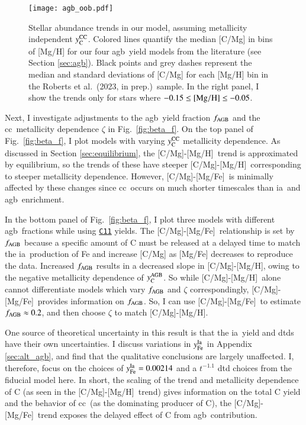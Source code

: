 \documentclass[12pt,oneside,letterpaper]{report}
\newcommand{\cc}{\gls{cc}}
\newcommand{\agb}{\gls{agb}}
\newcommand{\ia}{\gls{ia}}
\newcommand{\citetjack}{Roberts et al.~(2023, in prep.)}
\newcommand{\cxi}{\texttt{\hyperlink{C11}{C11}}}
\newcommand{\caah}{[C/Mg]-[Mg/H]}
\newcommand{\caafe}{[C/Mg]-[Mg/Fe]}
\newcommand{\Ycc}{\ensuremath{y_{\rm C}^{\rm CC}}}
\newcommand{\Ycagb}{\ensuremath{y_{\rm C}^{\rm AGB}}}
\begin{document}
\begin{figure}[htp]
\centering
\texttt{[image: agb\_oob.pdf]}
\caption[Median Stellar Abundance Trends]{
    Stellar abundance trends in our model, assuming metallicity independent $\Ycc$. Colored lines quantify the median [C/Mg] in bins of [Mg/H] for our four \agb\ yield models from the literature (see Section \ref{sec:agb}). Black points and grey dashes represent the median and standard deviations of [C/Mg] for each [Mg/H] bin in the \citetjack~sample. In the right panel, I show the trends only for stars where $-0.15\leq {\rm [Mg/H]}\leq -0.05$.
}
\label{fig:agb_sims}
\end{figure}


Next, I investigate adjustments to the \agb\ yield fraction $f_{\rm AGB}$ and the \cc\ metallicity dependence $\zeta$ in Fig.~\ref{fig:beta_f}. On the top panel of Fig.~\ref{fig:beta_f}, I plot models with varying $\Ycc$ metallicity dependence. As discussed in Section \ref{sec:equilibrium}, the \caah~trend is approximated by equilibrium, so the trends of these have steeper \caah~corresponding to steeper metallicity dependence. However, \caafe~is minimally affected by these changes since \cc\ occurs on much shorter timescales than \ia\ and \agb\ enrichment.

In the bottom panel of Fig.~\ref{fig:beta_f}, I plot three models with different \agb\ fractions while using \cxi{} yields.  The \caafe~relationship is set by $f_{\rm AGB}$ because a specific amount of C must be released at a delayed time to match the \ia\ production of Fe and increase [C/Mg] as [Mg/Fe] decreases to reproduce the data.
Increased $f_{\rm AGB}$ results in a decreased slope in \caah, owing to the negative metallicity dependence of $\Ycagb$. So while \caah~alone cannot differentiate models which vary $f_{\rm AGB}$ and $\zeta$ correspondingly, \caafe~provides information on $f_{\rm AGB}$. So, I can use \caafe~to estimate $f_{\rm AGB}\approx 0.2$, and then choose $\zeta$ to match \caah.

One source of theoretical uncertainty in this result is that the \ia\ yield and \gls{dtd}s have their own uncertainties. I discuss variations in $y_{\rm Fe}^{\rm Ia}$ in Appendix \ref{sec:alt_agb}, and find that the qualitative conclusions are largely unaffected. I, therefore, focus on the choices of $y_{\rm Fe}^{\rm Ia} = 0.00214$ and a $t^{-1.1}$ \gls{dtd} choices from the fiducial model here.
In short, the scaling of the trend and metallicity dependence of C (as seen in
the \caah\ trend) gives information on the total C yield and the behavior of \cc\ (as the dominating producer of C), the \caafe\ trend exposes the delayed effect of C from \agb\ contribution.
\end{document}
